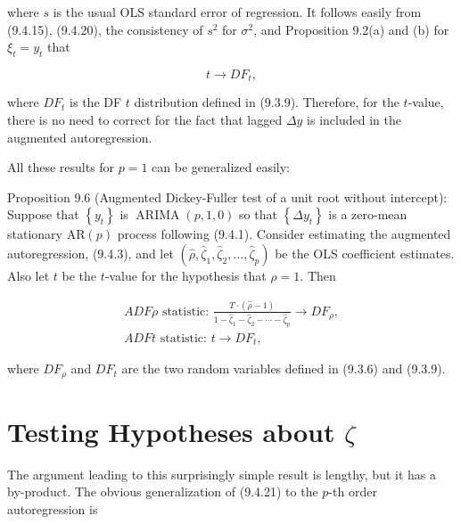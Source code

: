 \documentclass[10pt]{article}
\begin{document}
where $s$ is the usual OLS standard error of regression. It follows easily from (9.4.15), (9.4.20), the consistency of $s^{2}$ for $\sigma^{2}$, and Proposition 9.2(a) and (b) for $\xi_{t}=y_{t}$ that


\begin{equation*}
t \rightarrow D F_{t}, \tag{9.4.24}
\end{equation*}


where $D F_{t}$ is the DF $t$ distribution defined in (9.3.9). Therefore, for the $t$-value, there is no need to correct for the fact that lagged $\Delta y$ is included in the augmented autoregression.

All these results for $p=1$ can be generalized easily:

Proposition 9.6 (Augmented Dickey-Fuller test of a unit root without intercept): Suppose that $\left\{y_{t}\right\}$ is $\operatorname{ARIMA}(p, 1,0)$ so that $\left\{\Delta y_{t}\right\}$ is a zero-mean stationary $\mathrm{AR}(p)$ process following (9.4.1). Consider estimating the augmented autoregression, (9.4.3), and let $\left(\hat{\rho}, \hat{\zeta}_{1}, \hat{\zeta}_{2}, \ldots, \hat{\zeta}_{p}\right)$ be the OLS coefficient estimates. Also let $t$ be the $t$-value for the hypothesis that $\rho=1$. Then


\begin{gather*}
A D F \rho \text { statistic: } \frac{T \cdot(\hat{\rho}-1)}{1-\hat{\zeta}_{1}-\hat{\zeta}_{2}-\cdots-\hat{\zeta}_{p}} \rightarrow D F_{\rho},  \tag{9.4.25}\\
A D F t \text { statistic: } t \rightarrow D F_{t}, \tag{9.4.26}
\end{gather*}


where $D F_{\rho}$ and $D F_{t}$ are the two random variables defined in (9.3.6) and (9.3.9).

\section*{Testing Hypotheses about $\zeta$}
The argument leading to this surprisingly simple result is lengthy, but it has a by-product. The obvious generalization of (9.4.21) to the $p$-th order autoregression is
\end{document}
